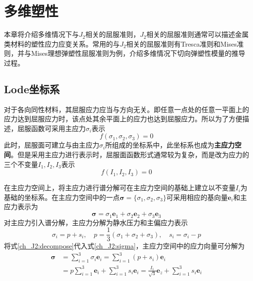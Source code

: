 \chapter{多维塑性}
本章将介绍多维情况下与$J_2$相关的屈服准则，$J_2$相关的屈服准则通常可以描述金属类材料的塑性应力应变关系。常用的与$J_2$相关的屈服准则有Tresca准则和Mises准则，并与Mises理想弹塑性屈服准则为例，介绍多维情况下切向弹塑性模量的推导过程。
\section{Lode坐标系}
对于各向同性材料，其屈服应力应当与方向无关。即任意一点处的任意一平面上的应力达到屈服应力时，该点处其余平面上的应力也达到屈服应力。所以为了方便描述，屈服函数可采用主应力$\sigma_i$表示
\begin{equation}
f(\sigma_1,\sigma_2,\sigma_3) = 0
\end{equation}
此时，屈服面可建立与由主应力$\sigma_i$所组成的坐标系中，此坐标系也成为\textbf{主应力空间}。但是采用主应力进行表示时，屈服面函数形式通常较为复杂，而是改为应力的三个不变量$I_1,I_2,I_3$表示
\begin{equation}
f(I_1,I_2,I_3) = 0
\end{equation}\par
在主应力空间上，将主应力进行谱分解可在主应力空间的基础上建立以不变量$I_i$为基础的坐标系。在主应力空间中的一点$\boldsymbol \sigma=\{\sigma_1,\sigma_2,\sigma_3\}$可采用相应的基向量$\boldsymbol e_i$和主应力表示为
\begin{equation}\label{ch_J2:sigma}
\boldsymbol \sigma = \sigma_1 \boldsymbol e_1 + \sigma_2 \boldsymbol e_2 + \sigma_3 \boldsymbol e_3
\end{equation}
对主应力引入谱分解，主应力分解为静水压力和主偏应力表示
\begin{equation}\label{ch_J2:decompose}
\sigma_i = p + s_i, \quad p = \frac{1}{3}(\sigma_1+\sigma_2+\sigma_3), \quad s_i = \sigma_i - p
\end{equation}
将式\eqref{ch_J2:decompose}代入式\eqref{ch_J2:sigma}，主应力空间中的应力向量可分解为
\begin{equation}
    \begin{split}
        \boldsymbol \sigma &= \sum_{i=1}^3 \sigma_i \boldsymbol e_i = \sum_{i=1}^3 (p + s_i) \boldsymbol e_i \\
                           &= p \sum_{i=1}^3 \boldsymbol e_i + \sum_{i=1}^3 s_i \boldsymbol e_i = \frac{I_1}{\sqrt{3}} \boldsymbol e_z + \sum_{i=1}^3 s_i \boldsymbol e_i
    \end{split}
\end{equation}
